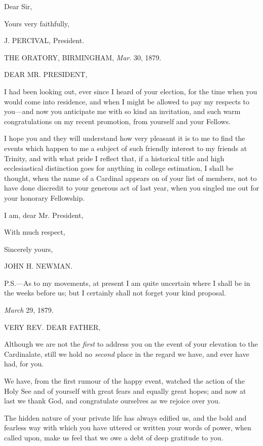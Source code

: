 Dear Sir,

Yours very faithfully,

J. PERCIVAL, President.


THE ORATORY, BIRMINGHAM,
\emph{Mar}. 30, 1879.

DEAR MR. PRESIDENT,

I had been looking out, ever since I heard of your election, for the
time when you would come into residence, and when I might be allowed
to pay my respects to you—and now you anticipate me with so kind an
invitation, and such warm congratulations on my recent promotion, from
yourself and your Fellows.

I hope you and they will understand how very pleasant it is to me
to find the events which happen to me a subject of such friendly
interest to my friends at Trinity, and with what pride I reflect that,
if a historical title and high ecclesiastical distinction goes
for anything in college estimation, I shall be thought, when the name
of a Cardinal appears on of your list of members, not to have done
discredit to your generous act of last year, when you singled me out
for your honorary Fellowship.

I am, dear Mr. President,

With much respect,

Sincerely yours,

JOHN H. NEWMAN.

P.S.—As to my movements, at present I am quite uncertain where I
shall be in the weeks before us; but I certainly shall not forget your
kind proposal.


\emph{March} 29, 1879.

VERY REV. DEAR
FATHER,

Although we are not the \emph{first} to address you on the event of
your elevation to the Cardinalate, still we hold no \emph{second}
place in the regard we have, and ever have had, for you.

We have, from the first rumour of the happy event, watched the
action of the Holy See and of yourself with great fears and
equally great hopes; and now at last we thank God, and congratulate
ourselves as we rejoice over you.

The hidden nature of your private life has always edified us, and
the bold and fearless way with which you have uttered or written your
words of power, when called upon, make us feel that we owe a debt of
deep gratitude to you.

